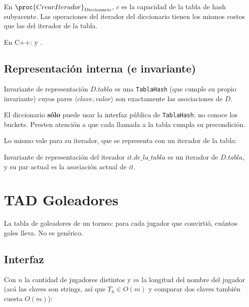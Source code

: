 \documentclass{article}
\newcommand{\OP}[2]{\proc{#1}_{\text{#2}}}
\begin{document}
En $\OP{CrearIterador}{Diccionario}$, $c$ es la capacidad de la tabla de
hash subyacente. Las operaciones del iterador del diccionario tienen los
mismos costos que las del iterador de la tabla.

En C++:  y
.

\subsection{Representación interna (e invariante)}

\begin{invariante}{Invariante de representación}
$D.tabla$ es una \texttt{TablaHash} (que cumple su propio invariante)
cuyos pares $\langle clave, valor \rangle$ son exactamente las
asociaciones de $D$.
\end{invariante}

El diccionario \textbf{sólo} puede usar la interfaz pública de
\texttt{TablaHash}: no conoce los buckets. Presten atención a que cada
llamada a la tabla cumpla su precondición.

Lo mismo vale para su iterador, que se representa con un iterador de la
tabla:

\begin{invariante}{Invariante de representación del iterador}
$it.de\_la\_tabla$ es un iterador de $D.tabla$, y su par actual es la
asociación actual de $it$.
\end{invariante}

\section{TAD Goleadores}

La tabla de goleadores de un torneo: para cada jugador que convirtió,
cuántos goles lleva. No es genérico.

\subsection{Interfaz}

Con $n$ la cantidad de jugadores distintos y $m$ la longitud del nombre
del jugador (acá las claves son strings, así que $T_h \in O(m)$ y
comparar dos claves también cuesta $O(m)$):
\end{document}
